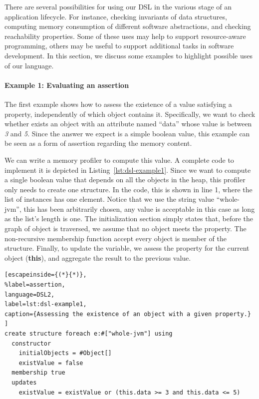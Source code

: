 There are several possibilities for using our DSL in the various stage of an application lifecycle.
For instance, checking invariants of data structures, computing memory consumption of different software abstractions, and checking reachability properties.
Some of these uses may help to support resource-aware programming, others may be useful to support additional tasks in software development.
In this section, we discuss some examples to highlight possible uses of our language.
 
\paragraph{Example 1: Evaluating an assertion}
The first example shows how to assess the existence of a value satisfying a property, independently of which object contains it.
Specifically, we want to check whether exists an object with an attribute named ``data'' whose value is between \textit{3} and \textit{5}.
Since the answer we expect is a simple boolean value, this example can be seen as a form of assertion regarding the memory content.

We can write a memory profiler to compute this value.
A complete code to implement it is depicted in Listing~\ref{lst:dsl-example1}.
Since we want to compute a single boolean value that depends on all the objects in the heap, this profiler only needs to create one structure.
In the code, this is shown in line 1, where the list of instances has one element.
Notice that we use the string value ``whole-jvm'', this has been arbitrarily chosen, any value is acceptable in this case as long as the list's length is one.
The initialization section simply states that, before the graph of object is traversed, we assume that no object meets the property.
The non-recursive membership function accept every object is member of the structure.
Finally, to update the variable, we assess the property for the current object (\textbf{this}), and aggregate the result to the previous value.

\begin{lstlisting}[escapeinside={(*}{*)},
%label=assertion, 
language=DSL2,
label=lst:dsl-example1,
caption={Assessing the existence of an object with a given property.}
]
create structure foreach e:#["whole-jvm"] using
  constructor
    initialObjects = #Object[]
    existValue = false
  membership true
  updates 
    existValue = existValue or (this.data >= 3 and this.data <= 5)
\end{lstlisting}


